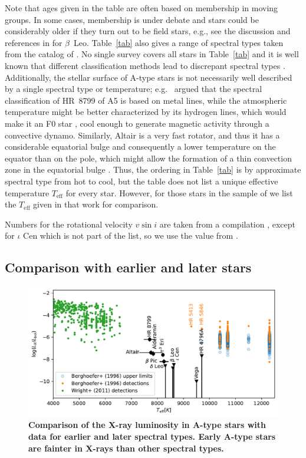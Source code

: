 \documentclass[preprint2]{aastex631}
\begin{document}
Note that ages given in the table are often based on membership in moving groups. In some cases, membership is under debate and stars could be considerably older if they turn out to be field stars, e.g., see the discussion and references in \citet{2021AJ....161..186D} for $\beta$~Leo. Table~\ref{tab} also gives a range of spectral types taken from the catalog of \citet[][see there for a full list of spectral type references]{2014yCat....1.2023S}. 
No single survey covers all stars in Table~\ref{tab} and it is well known that different classification methods lead to discrepant spectral types  \citep[e.g.,][]{1989ApJS...70..623G}.
Additionally, the stellar surface of A-type stars is not necessarily well described by a single spectral type or temperature; e.g.\ \citet{2010A&A...516A..38R} argued that the
spectral classification of HR~8799 of A5 is based on metal lines,
while the atmospheric temperature might be better characterized by its
hydrogen lines, which would make it an F0 star
\citep{1999AJ....118.2993G}, cool enough to generate magnetic activity
through a convective dynamo. Similarly,  Altair is a very fast rotator, and thus it has a considerable equatorial bulge and consequently a lower temperature on the equator than on the pole, which might allow the formation of a thin convection zone in the equatorial bulge \citep{2009A&A...497..511R}. Thus, the ordering in Table~\ref{tab} is by approximate spectral type from hot to cool, but the table does not list a unique effective temperature $T_\mathrm{eff}$ for every star. However, for those stars in the sample of \citet{2002ApJ...579..800S} we list the $T_\mathrm{eff}$ given in that work for comparison.

Numbers for the rotational velocity $v \sin i$ are taken from a compilation \citep{2002A&A...393..897R}, except for $\iota$ Cen which is not part of the list, so we use the value from \cite{2002ApJ...579..800S}.

\subsection{Comparison with earlier and later stars}
\begin{figure}
    \centering
    \includegraphics[width=\textwidth]{figures/lxlbol.pdf}
    \caption{\textbf{Comparison of the X-ray luminosity in A-type stars with data for earlier and later spectral types. Early A-type stars are fainter in X-rays than other spectral types.}
    \label{fig:lxlbol}}
\end{figure}
\end{document}
